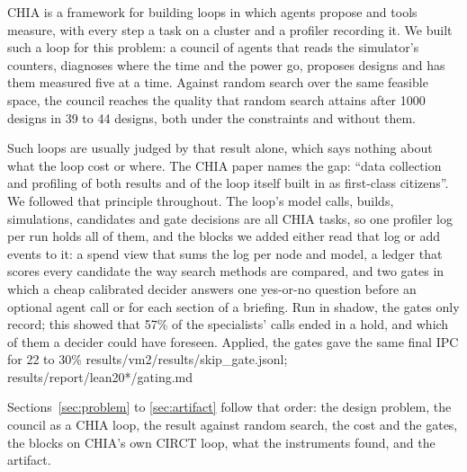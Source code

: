 \documentclass[conference]{IEEEtran}
\begin{document}
CHIA \cite{chia} is a framework for building loops in which agents propose and tools measure,
with every step a task on a cluster and a profiler recording it. We built such a loop for this
problem: a council of agents that reads the simulator's counters, diagnoses where the time and
the power go, proposes designs and has them measured five at a time. Against random search over
the same feasible space, the council reaches the quality that random search attains after 1000
designs in 39 to 44 designs, both under the constraints and without them. %

Such loops are usually judged by that result alone, which says nothing about what the loop
cost or where. The CHIA paper \cite{chia} names the gap: ``data collection and profiling of both
results and of the loop itself built in as first-class citizens''. %
We followed that principle throughout. The loop's model calls, builds, simulations, candidates
and gate decisions are all CHIA tasks, so one profiler log per run holds all of them, and the
blocks we added either read that log or add events to it: a spend view that sums the log per
node and model, a ledger that scores every candidate the way search methods are compared, and two
gates in which a cheap calibrated decider answers one yes-or-no question before an optional agent
call or for each section of a briefing. Run in shadow, the gates only record; this showed that
57\% of the specialists' calls ended in a hold, and which of them a decider could have foreseen.
Applied, the gates gave the same final IPC for 22 to 30\% results/vm2/results/skip_gate.jsonl; results/report/lean20*/gating.md

Sections~\ref{sec:problem} to \ref{sec:artifact} follow that order: the design problem, the
council as a CHIA loop, the result against random search, the cost and the gates, the blocks on
CHIA's own CIRCT loop, what the instruments found, and the artifact.

\end{document}
